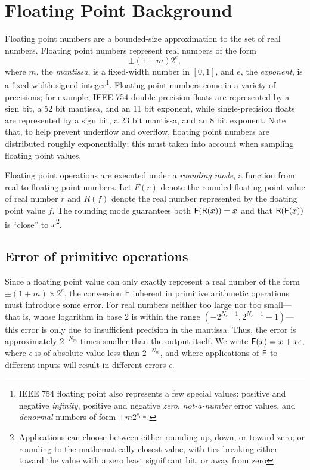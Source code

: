 \documentclass[paper.tex]{subfiles}
\begin{document}
\section{Floating Point Background}
\label{sec:background}

Floating point numbers are a bounded-size approximation
  to the set of real numbers.
Floating point numbers represent real numbers of the form
\[ \pm (1 + m) 2^e, \]%
where $m$, the \emph{mantissa}, is a fixed-width number in $[0, 1]$,
and $e$, the \emph{exponent}, is a fixed-width signed
integer\footnote{IEEE 754 floating point also represents a few special
  values: positive and negative \emph{infinity}, positive and negative
  \emph{zero}, \emph{not-a-number} error values, and \emph{denormal}
  numbers of form $\pm m 2^{e_{\text{min}}}$.}.
Floating point numbers come in a variety of precisions;
  for example, IEEE 754 double-precision floats are represented by a sign bit,
  a 52 bit mantissa, and an 11 bit exponent,
  while single-precision floats are represented by a sign bit,
  a 23 bit mantissa, and an 8 bit exponent.
Note that, to help prevent underflow and overflow,
  floating point numbers are distributed roughly exponentially;
  this must taken into account when sampling floating point values.

Floating point operations are executed under a \textit{rounding mode},
  a function from real to floating-point numbers.
Let $F(r)$ denote the rounded floating point value of real number $r$
and $R(f)$ denote the real number represented by
  the floating point value $f$.
The rounding mode guarantees both $\mathsf{F}(\mathsf{R}(x)) = x$ and that
  $\mathsf{R}(\mathsf{F}(x))$ is ``close'' to $x$\footnote{Applications can choose
  between either rounding up, down, or toward zero; or rounding to the
  mathematically closest value, with ties breaking either toward the
  value with a zero least significant bit, or away from zero}.

\subsection{Error of primitive operations}

Since a floating point value can only exactly represent
  a real number of the form $\pm(1 + m) \times 2^e$,
  the conversion $\mathsf{F}$ inherent in primitive arithmetic operations must introduce some error.
For real numbers neither too large nor too small---%
  that is, whose logarithm in base 2 is within the range
  $(-2^{N_e-1}, 2^{N_e-1} - 1)$---%
  this error is only due to insufficient precision in the mantissa.
Thus, the error is approximately $2^{-N_m}$ times smaller
  than the output itself.
We write $\mathsf{F}(x) = x + x\epsilon$, where $\epsilon$
  is of absolute value less than $2^{-N_m}$, and where applications of
  $\mathsf{F}$ to different inputs will result in different errors $\epsilon$.
\end{document}
